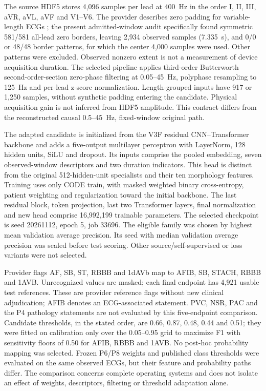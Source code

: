 The source HDF5 stores 4,096 samples per lead at 400~Hz in the order I, II, III, aVR, aVL, aVF and V1--V6. The provider describes zero padding for variable-length ECGs \citep{CODE15Dataset}; the present admitted-window audit specifically found symmetric 581/581 all-lead zero borders, leaving 2,934 observed samples (7.335~s), and 0/0 or 48/48 border patterns, for which the center 4,000 samples were used. Other patterns were excluded. Observed nonzero extent is not a measurement of device acquisition duration. The selected pipeline applies third-order Butterworth second-order-section zero-phase filtering at 0.05--45~Hz, polyphase resampling to 125~Hz and per-lead z-score normalization. Length-grouped inputs have 917 or 1,250 samples, without synthetic padding entering the candidate. Physical acquisition gain is not inferred from HDF5 amplitude. This contract differs from the reconstructed causal 0.5--45~Hz, fixed-window original path.

The adapted candidate is initialized from the V3F residual CNN--Transformer backbone and adds a five-output multilayer perceptron with LayerNorm, 128 hidden units, SiLU and dropout. Its inputs comprise the pooled embedding, seven observed-window descriptors and two duration indicators. This head is distinct from the original 512-hidden-unit specialists and their ten morphology features. Training uses only CODE train, with masked weighted binary cross-entropy, patient weighting and regularization toward the initial backbone. The last residual block, token projection, last two Transformer layers, final normalization and new head comprise 16,992,199 trainable parameters. The selected checkpoint is seed 20261112, epoch 5, job 33696. The eligible family was chosen by highest mean validation average precision. Its seed with median validation average precision was sealed before test scoring. Other source/self-supervised or loss variants were not selected.

Provider flags AF, SB, ST, RBBB and 1dAVb map to AFIB, SB, STACH, RBBB and 1AVB. Unrecognized values are masked; each final endpoint has 4,921 usable test references. These are provider reference flags without new clinical adjudication; AFIB denotes an ECG-associated statement. PVC, NSR, PAC and the P4 pathology statements are not evaluated by this five-endpoint comparison. Candidate thresholds, in the stated order, are 0.66, 0.87, 0.48, 0.44 and 0.51; they were fitted on calibration only over the 0.05--0.95 grid to maximize F1 with sensitivity floors of 0.50 for AFIB, RBBB and 1AVB. No post-hoc probability mapping was selected. Frozen P6/P8 weights and published class thresholds were evaluated on the same observed ECGs, but their feature and probability paths differ. The comparison concerns complete operating systems and does not isolate an effect of weights, descriptors, filtering or threshold adaptation alone.

